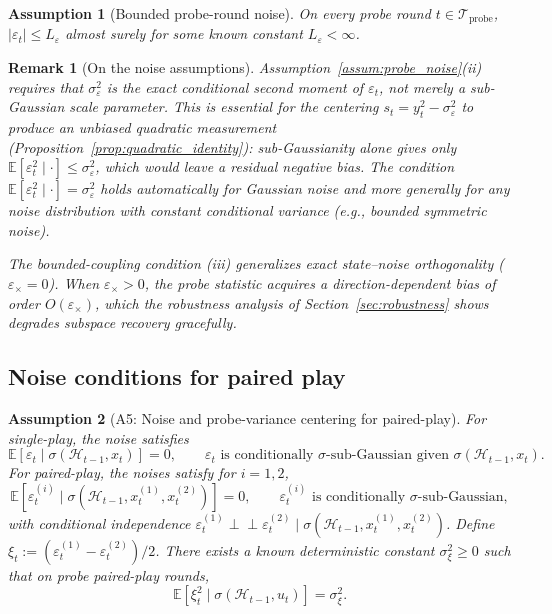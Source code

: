 \documentclass[12pt]{article}
\newcommand{\E}{\mathbb{E}}
\newcommand{\cH}{\mathcal{H}}
\newcommand{\cTprobe}{\mathcal{T}_{\mathrm{probe}}}
\newtheorem{assumption}{Assumption}
\newtheorem{remark}{Remark}
\theoremstyle{plain}
\theoremstyle{definition}
\begin{document}
\begin{assumption}[Bounded probe-round noise]
\label{assum:bounded_probe_noise}
On every probe round $t \in \cTprobe$,
$|\varepsilon_t| \le L_\varepsilon$ almost surely
for some known constant $L_\varepsilon < \infty$.
\end{assumption}

\begin{remark}[On the noise assumptions]
\label{rem:weakened_noise}
Assumption~\ref{assum:probe_noise}(ii) requires that $\sigma_\varepsilon^2$ is the \emph{exact} conditional second moment of $\varepsilon_t$, not merely a sub-Gaussian scale parameter. This is essential for the centering $s_t = y_t^2 - \sigma_\varepsilon^2$ to produce an unbiased quadratic measurement (Proposition~\ref{prop:quadratic_identity}): sub-Gaussianity alone gives only $\E[\varepsilon_t^2 \mid \cdot] \le \sigma_\varepsilon^2$, which would leave a residual negative bias. The condition $\E[\varepsilon_t^2 \mid \cdot] = \sigma_\varepsilon^2$ holds automatically for Gaussian noise and more generally for any noise distribution with constant conditional variance (e.g., bounded symmetric noise).

The bounded-coupling condition (iii) generalizes exact state--noise orthogonality ($\varepsilon_\times = 0$). When $\varepsilon_\times > 0$, the probe statistic acquires a direction-dependent bias of order $O(\varepsilon_\times)$, which the robustness analysis of Section~\ref{sec:robustness} shows degrades subspace recovery gracefully.
\end{remark}

\subsection{Noise conditions for paired play}

\begin{assumption}[A5: Noise and probe-variance centering for paired-play]
\label{assum:paired_noise}
For single-play, the noise satisfies
\[
\E[\varepsilon_t \mid \sigma(\cH_{t-1}, x_t)] = 0,
\qquad
\varepsilon_t \text{ is conditionally $\sigma$-sub-Gaussian given } \sigma(\cH_{t-1}, x_t).
\]
For paired-play, the noises satisfy for $i = 1, 2$,
\[
\E[\varepsilon_t^{(i)} \mid \sigma(\cH_{t-1}, x_t^{(1)}, x_t^{(2)})] = 0,
\qquad
\varepsilon_t^{(i)} \text{ is conditionally $\sigma$-sub-Gaussian},
\]
with conditional independence
$\varepsilon_t^{(1)} \perp\!\!\!\perp \varepsilon_t^{(2)} \mid \sigma(\cH_{t-1}, x_t^{(1)}, x_t^{(2)})$.
Define $\xi_t := (\varepsilon_t^{(1)} - \varepsilon_t^{(2)})/2$. There exists a known deterministic constant $\sigma_\xi^2 \ge 0$ such that on probe paired-play rounds,
\[
\E[\xi_t^2 \mid \sigma(\cH_{t-1}, u_t)] = \sigma_\xi^2.
\]
\end{assumption}
\end{document}
